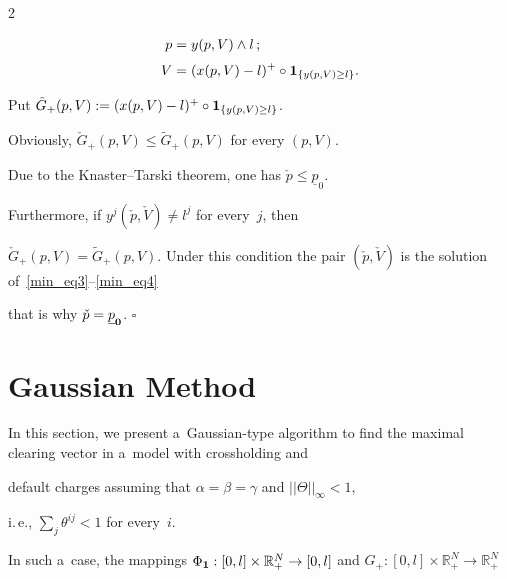 \begin{multicols}{2}
\noindent

\begin{align}

\label{min_eq3}

p &= y(p, V) \wedge l\,; \\[3pt]

\label{min_eq4}

V &= (x(p, V) - l)^+ \circ {\bf 1}_{\{y(p, V) \geq l\}}.

\end{align}



\vspace*{-4pt}



\noindent

Put $\tilde G_+(p, V) := (x(p, V) - l)^+ \circ {\bf 1}_{\{y(p, V) \geq l\}}$. 

Obviously, $\check G_+(p, V) \leq \tilde  G_+(p, V)$ for every $(p, V)$. 

Due to the Knaster--Tarski theorem, one has $\check p \leq \underline p_0$.

Furthermore, if $y^j(\check p, \check V) \neq l^j$ for every~$j$, then 

$\check G_+(p, V) = \tilde  G_+(p, V)$. Under this condition the pair $(\check p, \check V)$ is the solution of~\eqref{min_eq3}--\eqref{min_eq4}

 that is why $\check p = \underline p_{\bf 0}$. \hfill$\square$









\section{Gaussian Method}



\noindent

In this section, we present a~Gaussian-type   algorithm to find the maximal clearing vector in a~model with crossholding and 

default charges assuming that  $\alpha=\beta=\gamma$ and $||\Theta||_\infty<1$, 


 i.\,e., $\sum\nolimits_j \theta^{ij} < 1$ for every~$i$. 





In such a~case,   the mappings $\Phi_{\bf 1}:[0, l]\times  \mathbb{R}^N_+\to [0,l]$ and $G_+:[0, l]\times  \mathbb{R}^N_+\to \mathbb{R}^N_+$ 


\end{multicols}
